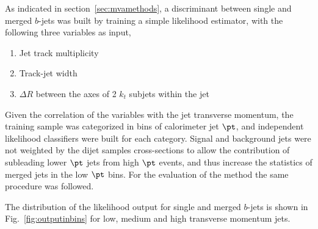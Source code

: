 


As indicated in section~\ref{sec:mvamethods}, a discriminant between single and merged $b$-jets was built by training a simple likelihood estimator, with the following three variables as input, 
%
\begin{enumerate}\addtolength{\itemsep}{-0.4\baselineskip}
\item
Jet track multiplicity
\item
Track-jet width
\item
$\Delta R$ between the axes of 2 $k_t$ subjets within the jet
\end{enumerate}
%

Given the correlation of the variables with the jet transverse momentum,  the training sample was categorized in bins of calorimeter jet $\pt$, and independent likelihood classifiers were built for each category.  Signal and background jets were not weighted by the dijet samples cross-sections to allow the contribution of subleading lower $\pt$ jets from high $\pt$ events, and thus increase the statistics of merged jets in the low $\pt$ bins. For the evaluation of the method the same procedure was followed.

The distribution of the likelihood output for single and merged $b$-jets is shown in  Fig.~\ref{fig:outputinbins} for low, medium and high transverse momentum jets.

